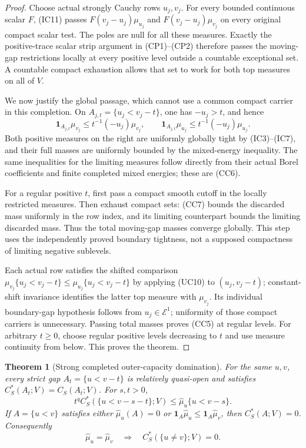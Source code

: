 \documentclass[11pt,a4paper]{article}
\numberwithin{equation}{section}
\newtheorem{theorem}{Theorem}[section]
\theoremstyle{definition}
\theoremstyle{remark}
\begin{document}
\begin{proof}
Choose actual strongly Cauchy rows $u_j,v_j$.
For every bounded continuous scalar $F$, (IC11) passes
$F(v_j-u_j)\mu_{u_j}$ and $F(v_j-u_j)\mu_{v_j}$ on every
original compact scalar test. The poles are null for all
these measures. Exactly the positive-trace scalar strip
argument in (CP1)--(CP2) therefore passes the moving-gap
restrictions locally at every positive level outside a
countable exceptional set. A countable compact exhaustion
allows that set to work for both top measures on all of $V$.

We now justify the global passage, which cannot use a common
compact carrier in this completion. On
$A_{j,t}=\{u_j<v_j-t\}$, one has $-u_j>t$, and hence
\[
 \mathbf1_{A_{j,t}}\mu_{v_j}
             \leq t^{-1}(-u_j)\mu_{v_j},\qquad
 \mathbf1_{A_{j,t}}\mu_{u_j}
             \leq t^{-1}(-u_j)\mu_{u_j}.
 \tag{CC7}
\]
Both positive measures on the right are uniformly globally
tight by (IC3)--(IC7), and their full masses are uniformly
bounded by the mixed-energy inequality. The same inequalities
for the limiting measures follow directly from their actual
Borel coefficients and finite completed mixed energies;
these are (CC6).

For a regular positive $t$, first pass a compact smooth cutoff
in the locally restricted measures. Then exhaust compact sets:
(CC7) bounds the discarded mass uniformly in the row index,
and its limiting counterpart bounds the limiting discarded
mass. Thus the total moving-gap masses converge globally.
This step uses the independently proved boundary tightness,
not a supposed compactness of limiting negative sublevels.

Each actual row satisfies the shifted comparison
$\mu_{v_j}\{u_j<v_j-t\}\leq\mu_{u_j}\{u_j<v_j-t\}$
by applying (UC10) to $(u_j,v_j-t)$; constant-shift invariance
identifies the latter top measure with $\mu_{v_j}$.
Its individual boundary-gap hypothesis follows
from $u_j\in\mathcal E^1$; uniformity of those compact
carriers is unnecessary. Passing total masses proves (CC5)
at regular levels. For arbitrary $t\geq0$, choose regular
positive levels decreasing to $t$ and use measure continuity
from below. This proves the theorem.
\end{proof}

\begin{theorem}[Strong completed outer-capacity domination]
\label{thm:r11-strong-completed-domination}
For the same $u,v$, every strict gap $A_t=\{u<v-t\}$ is
relatively quasi-open and satisfies $C_S^*(A_t;V)=C_S(A_t;V)$.
For $s,t>0$,
\[
        t^q C_S^*(\{u<v-s-t\};V)
                         \leq\widehat\mu_u\{u<v-s\}.
 \tag{CC8}
\]
If $A=\{u<v\}$ satisfies either
$\widehat\mu_u(A)=0$ or
$\mathbf1_A\widehat\mu_u\leq\mathbf1_A\widehat\mu_v$,
then $C_S^*(A;V)=0$. Consequently
\[
      \widehat\mu_u=\widehat\mu_v
             \quad\Longrightarrow\quad C_S^*(\{u\ne v\};V)=0.
 \tag{CC9}
\]
\end{theorem}
\end{document}
